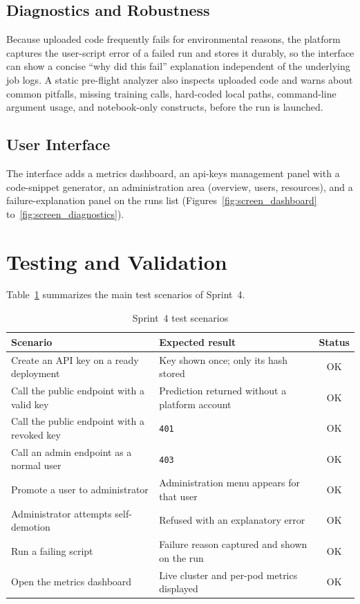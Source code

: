 \subsection{Diagnostics and Robustness}
Because uploaded code frequently fails for environmental reasons, the platform
captures the user-script error of a failed run and stores it durably, so the
interface can show a concise ``why did this fail'' explanation independent of the
underlying job logs. A static pre-flight analyzer also inspects uploaded code and
warns about common pitfalls, missing training calls, hard-coded local paths,
command-line argument usage, and notebook-only constructs, before the run is
launched.

\subsection{User Interface}
The interface adds a metrics dashboard, an \gls{api}-keys management panel with a
code-snippet generator, an administration area (overview, users, resources), and a
failure-explanation panel on the runs list
(Figures~\ref{fig:screen_dashboard} to~\ref{fig:screen_diagnostics}).

\section{Testing and Validation}
Table~\ref{tab:tests-s4} summarizes the main test scenarios of Sprint~4.

\begin{table}[H]\centering
\renewcommand{\arraystretch}{1.25}
\caption{Sprint~4 test scenarios}\label{tab:tests-s4}
\begin{tabularx}{\textwidth}{|X|X|c|}
\hline
\textbf{Scenario} & \textbf{Expected result} & \textbf{Status}\\
\hline
Create an API key on a ready deployment & Key shown once; only its hash stored & OK\\ \hline
Call the public endpoint with a valid key & Prediction returned without a platform account & OK\\ \hline
Call the public endpoint with a revoked key & \texttt{401} & OK\\ \hline
Call an admin endpoint as a normal user & \texttt{403} & OK\\ \hline
Promote a user to administrator & Administration menu appears for that user & OK\\ \hline
Administrator attempts self-demotion & Refused with an explanatory error & OK\\ \hline
Run a failing script & Failure reason captured and shown on the run & OK\\ \hline
Open the metrics dashboard & Live cluster and per-pod metrics displayed & OK\\ \hline
\end{tabularx}
\end{table}

